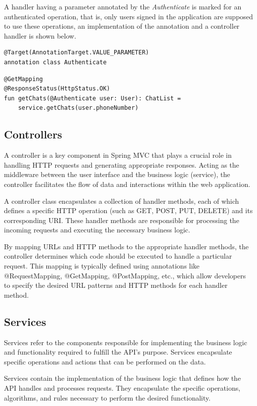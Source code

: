 A handler having a parameter annotated by the \textit{Authenticate} is marked for an authenticated operation, that is, only users signed in the application are supposed to use these operations, an implementation of the annotation and a controller handler is shown below.

\begin{verbatim}
@Target(AnnotationTarget.VALUE_PARAMETER)
annotation class Authenticate
\end{verbatim}


\begin{verbatim}
@GetMapping
@ResponseStatus(HttpStatus.OK)
fun getChats(@Authenticate user: User): ChatList =
    service.getChats(user.phoneNumber)
\end{verbatim}
 

\subsection{Controllers}
A controller is a key component in Spring MVC that plays a crucial role in handling HTTP requests and generating appropriate responses. Acting as the middleware between the user interface and the business logic (service), the controller facilitates the flow of data and interactions within the web application.

A controller class encapsulates a collection of handler methods, each of which defines a specific HTTP operation (such as GET, POST, PUT, DELETE) and its corresponding URI. These handler methods are responsible for processing the incoming requests and executing the necessary business logic.

By mapping URLs and HTTP methods to the appropriate handler methods, the controller determines which code should be executed to handle a particular request. This mapping is typically defined using annotations like @RequestMapping, @GetMapping, @PostMapping, etc., which allow developers to specify the desired URL patterns and HTTP methods for each handler method.

\subsection{Services}
Services refer to the components responsible for implementing the business logic and functionality required to fulfill the API's purpose. 
Services encapsulate specific operations and actions that can be performed on the data.

Services contain the implementation of the business logic that defines how the API handles and processes requests. They encapsulate the specific operations, algorithms, and rules necessary to perform the desired functionality. 

